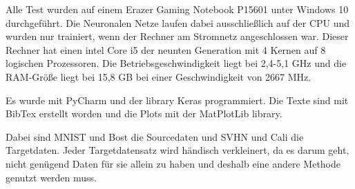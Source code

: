 Alle Test wurden auf einem Erazer Gaming Notebook P15601 unter Windows 10 durchgeführt.
Die Neuronalen Netze laufen dabei ausschließlich auf 
der CPU und wurden nur trainiert, wenn der Rechner am Stromnetz angeschlossen war. 
Dieser Rechner hat einen intel Core i5 der neunten Generation mit 4 Kernen auf 8 
logischen Prozessoren. Die Betriebsgeschwindigkeit liegt bei 2,4-5,1 GHz und die 
RAM-Größe liegt bei 15,8 GB bei einer Geschwindigkeit von 2667 MHz. 

Es wurde mit PyCharm und der library Keras programmiert. Die Texte sind mit BibTex 
erstellt worden und die Plots mit der MatPlotLib library.

Dabei sind MNIST und Bost die Sourcedaten und SVHN und Cali die Targetdaten. Jeder Targetdatensatz 
wird händisch verkleinert, da es darum geht, nicht genügend Daten für sie allein zu haben und deshalb eine andere 
Methode genutzt werden muss.
